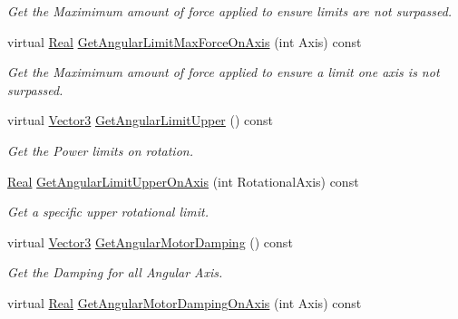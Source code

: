 \begin{DoxyCompactItemize}
\begin{DoxyCompactList}\small\item\em Get the Maximimum amount of force applied to ensure limits are not surpassed. \item\end{DoxyCompactList}\item 
virtual \hyperlink{namespaceMezzanine_a726731b1a7df72bf3583e4a97282c6f6}{Real} \hyperlink{classMezzanine_1_1Generic6DofConstraint_abb6d534f3fd2416c1642d7574e68565d}{GetAngularLimitMaxForceOnAxis} (int Axis) const 
\begin{DoxyCompactList}\small\item\em Get the Maximimum amount of force applied to ensure a limit one axis is not surpassed. \item\end{DoxyCompactList}\item 
virtual \hyperlink{classMezzanine_1_1Vector3}{Vector3} \hyperlink{classMezzanine_1_1Generic6DofConstraint_a5899d2668fe8ab1c4ec3310d1679082e}{GetAngularLimitUpper} () const 
\begin{DoxyCompactList}\small\item\em Get the Power limits on rotation. \item\end{DoxyCompactList}\item 
\hyperlink{namespaceMezzanine_a726731b1a7df72bf3583e4a97282c6f6}{Real} \hyperlink{classMezzanine_1_1Generic6DofConstraint_abd364ebc562646bb46b2b003a54d6ca4}{GetAngularLimitUpperOnAxis} (int RotationalAxis) const 
\begin{DoxyCompactList}\small\item\em Get a specific upper rotational limit. \item\end{DoxyCompactList}\item 
virtual \hyperlink{classMezzanine_1_1Vector3}{Vector3} \hyperlink{classMezzanine_1_1Generic6DofConstraint_aa623d540221586a7cad7080e7404282a}{GetAngularMotorDamping} () const 
\begin{DoxyCompactList}\small\item\em Get the Damping for all Angular Axis. \item\end{DoxyCompactList}\item 
virtual \hyperlink{namespaceMezzanine_a726731b1a7df72bf3583e4a97282c6f6}{Real} \hyperlink{classMezzanine_1_1Generic6DofConstraint_a5910bdd1869a1e4580389ac66c769710}{GetAngularMotorDampingOnAxis} (int Axis) const 

\end{DoxyCompactItemize}
